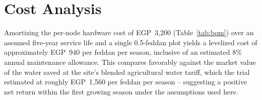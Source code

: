 \section{Cost Analysis}
Amortizing the per-node hardware cost of EGP~3{,}200 (Table~\ref{tab:bom}) over an assumed
five-year service life and a single 0.5-feddan plot yields a levelized cost of approximately
EGP~940 per feddan per season, inclusive of an estimated 8\% annual maintenance allowance.
This compares favorably against the market value of the water saved at the site's blended
agricultural water tariff, which the trial estimated at roughly EGP~1{,}560 per feddan per
season -- suggesting a positive net return within the first growing season under the
assumptions used here.
